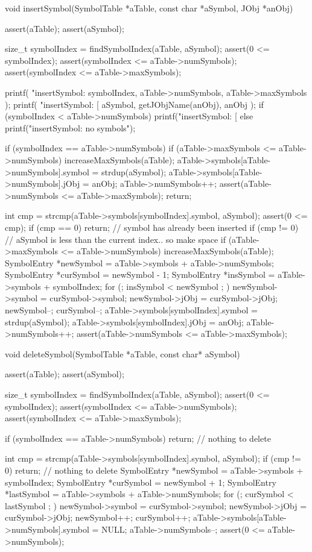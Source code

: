 void insertSymbol(SymbolTable *aTable, const char *aSymbol, JObj *anObj) {
  assert(aTable);
  assert(aSymbol);
  
  size_t symbolIndex = findSymbolIndex(aTable, aSymbol);
  assert(0 <= symbolIndex);
  assert(symbolIndex <= aTable->numSymbols);
  assert(symbolIndex <= aTable->maxSymbols);
  
  printf(
    "insertSymbol: %
    symbolIndex,
    aTable->numSymbols,
    aTable->maxSymbols
  );
  printf(
    "insertSymbol: [%
    aSymbol,
    getJObjName(anObj),
    anObj
  );
  if (symbolIndex < aTable->numSymbols) {
    printf("insertSymbol: [%
  } else {
    printf("insertSymbol: no symbols\n");
  }
  
  if (symbolIndex == aTable->numSymbols) {
    if (aTable->maxSymbols <= aTable->numSymbols) increaseMaxSymbols(aTable);
    aTable->symbols[aTable->numSymbols].symbol = strdup(aSymbol);
    aTable->symbols[aTable->numSymbols].jObj   = anObj;
    aTable->numSymbols++;
    assert(aTable->numSymbols <= aTable->maxSymbols);
    return;
  }
  
  int cmp = strcmp(aTable->symbols[symbolIndex].symbol, aSymbol);
  assert(0 <= cmp);
  if (cmp == 0) return; // symbol has already been inserted
  if (cmp != 0) { // aSymbol is less than the current index.. so make space
    if (aTable->maxSymbols <= aTable->numSymbols) increaseMaxSymbols(aTable);
    SymbolEntry *newSymbol = aTable->symbols + aTable->numSymbols;
    SymbolEntry *curSymbol = newSymbol - 1;
    SymbolEntry *insSymbol = aTable->symbols + symbolIndex;
    for (; insSymbol < newSymbol ; ) {
      newSymbol->symbol = curSymbol->symbol;
      newSymbol->jObj   = curSymbol->jObj;
      newSymbol--;
      curSymbol--;
    }
  }
  aTable->symbols[symbolIndex].symbol = strdup(aSymbol);
  aTable->symbols[symbolIndex].jObj   = anObj;
  aTable->numSymbols++;
  assert(aTable->numSymbols <= aTable->maxSymbols);
}

void deleteSymbol(SymbolTable *aTable, const char* aSymbol) {
  assert(aTable);
  assert(aSymbol);
  
  size_t symbolIndex = findSymbolIndex(aTable, aSymbol);
  assert(0 <= symbolIndex);
  assert(symbolIndex <= aTable->numSymbols);
  assert(symbolIndex <= aTable->maxSymbols);

  if (symbolIndex == aTable->numSymbols) return; // nothing to delete
  
  int cmp = strcmp(aTable->symbols[symbolIndex].symbol, aSymbol);
  if (cmp != 0) return; // nothing to delete
  SymbolEntry *newSymbol = aTable->symbols + symbolIndex;
  SymbolEntry *curSymbol = newSymbol + 1;
  SymbolEntry *lastSymbol = aTable->symbols + aTable->numSymbols;
  for (; curSymbol < lastSymbol ; ) {
    newSymbol->symbol = curSymbol->symbol;
    newSymbol->jObj   = curSymbol->jObj;
    newSymbol++;
    curSymbol++;
  }
  aTable->symbols[aTable->numSymbols].symbol = NULL;
  aTable->numSymbols--;
  assert(0 <= aTable->numSymbols);
}

